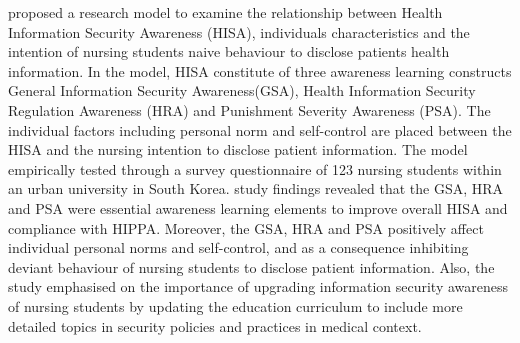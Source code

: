 \citet{Park2017} proposed a research model to examine the relationship between Health Information Security Awareness (HISA), individuals characteristics and the intention of nursing students naive behaviour to disclose patients health information. In the model, HISA constitute of three awareness learning constructs General Information Security Awareness(GSA), Health Information Security Regulation Awareness (HRA) and Punishment Severity Awareness (PSA). The individual factors including personal norm and self-control are placed between the HISA and the nursing intention to disclose patient information. The model empirically tested through a survey questionnaire of 123 nursing students within an urban university in South Korea. \citet{Park2017} study findings revealed that the GSA, HRA and PSA were essential awareness learning elements to improve overall HISA and compliance with HIPPA. Moreover, the GSA, HRA and PSA positively affect individual personal norms and self-control, and as a consequence inhibiting deviant behaviour of nursing students to disclose patient information. Also, the study emphasised on the importance of upgrading information security awareness of nursing students by updating the education curriculum to include more detailed topics in security policies and practices in medical context.







